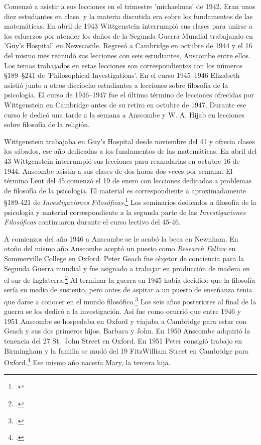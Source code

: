 Comenzó a asistir a sus lecciones en el trimestre 'michaelmas' de
    1942. Eran unos diez estudiantes en clase, y la materia discutida era sobre los
    fundamentos de las matemáticas. En abril de 1943 Wittgenstein interrumpió sus
    clases para unirse a los esfuerzos por atender los daños de la Segunda Guerra
    Mundial trabajando en 'Guy's Hospital' en Newscastle. Regresó a Cambridge en
    octubre de 1944 y el 16 del mismo mes reanudó sus lecciones con seis
    estudiantes, Anscombe entre ellos. Los temas trabajados en estas lecciones son
    correspondientes con los números \S189--\S241 de 'Philosophical Investigations'.
    En el curso 1945--1946 Elizabeth asistió junto a otros dieciocho estudiantes a
    lecciones sobre filosofía de la psicología. El curso de 1946--1947 fue el último
    término de lecciones ofrecidas por Wittgenstein en Cambridge antes de su retiro
    en octubre de 1947. Durante ese curso le dedicó una tarde a la semana a Anscombe
    y W. A. Hijab en lecciones sobre filosofía de la religión.

  Wittgenstein trabajaba en Guy's Hospital desde noviembre del 41 y ofrecia clases
  los sábados, ese año dedicadas a los fundamentos de las matemáticas. En abril
  del 43 Wittgenstein interrumpió sus lecciones para reanudarlas en octubre 16 de
  1944. Anscombe asistía a sus clases de dos horas dos veces por semana. El
  término Lent del 45 comenzó el 19 de enero con lecciones dedicadas a problemas
  de filosofía de la psicología. El material es correspondiente a aproximadamente
  \S189-421 de \emph{Investigaciones
    Filosóficas}.\footcite[cf.~][pp.~354-356]{pubnpriv} Los seminarios dedicados a
  filosofía de la psicología y material correspondiente a la segunda parte de las
  \emph{Investigaciones Filosóficas} continuaron durante el curso lectivo del
  45-46.

  A comienzos del año 1946 a Anscombe se le acabó la beca en Newnham. En otoño del
  mismo año Anscombe aceptó un puesto como \emph{Research Fellow} en Sommerville
  College en Oxford. Peter Geach fue objetor de conciencia para la Segunda Guerra
  mundial y fue asignado a trabajar en producción de madera en el sur de
  Inglaterra.\footcite[cf.~][p.~34]{biofellows} Al terminar la guerra en 1945
  habia decidido que la filosofía sería su medio de sustento, pero antes de
  aspirar a un puesto de enseñanza tenia que darse a conocer en el mundo
  filosófico.\footcite[cf.~][p.~12]{phiaut} Los seis años posteriores al final de
  la guerra se los dedicó a la investigación. Así fue como ocurrió que entre 1946
  y 1951 Anscombe se hospedaba en Oxford y viajaba a Cambridge para estar con
  Geach y sus dos primeros hijos, Barbara y John. En 1950 Anscombe adquirió la
  tenencia del 27 St.~John Street en Oxford. En 1951 Peter consigió trabajo en
  Birmingham y la familia se mudó del 19 FitzWilliam Street en Cambridge para
  Oxford.\footcite[cf.~][p.~208]{NWR} Ese mismo año nacería Mary, la tercera hija.

